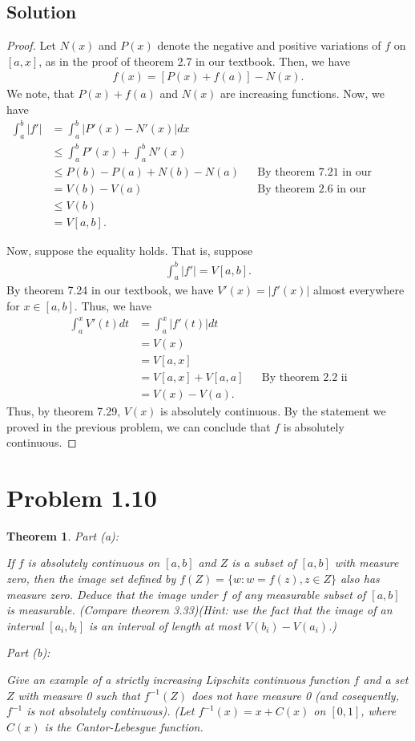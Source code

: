 \documentclass[10pt,a4paper]{article}
\makeatletter
\theoremstyle{theorem}
\newtheorem{theorem}{Theorem}
\newcommand{\proofpart}[2]{%
  \par
  \addvspace{\medskipamount}%
  \noindent\emph{Part #1: #2}\par\nobreak
  \addvspace{\smallskipamount}%
  \@afterheading
}
\theoremstyle{definition}
\makeatother
\begin{document}
\subsection*{Solution}
\begin{proof}
Let $N(x)$ and $P(x)$ denote the negative and positive variations of $f$ on $[a, x]$, as in the proof of theorem 2.7 in our textbook. Then, we have
\begin{align*}
f(x) = [P(x) + f(a)] - N(x).
\end{align*}
We note, that $P(x) + f(a)$ and $N(x)$ are increasing functions. Now, we have
\begin{align*}
\int_a^b |f'| &= \int_a^b |P'(x) - N'(x)| dx\\
&\leq \int_a^b P'(x) + \int_a^b N'(x)\\
&\leq P(b) - P(a) + N(b) - N(a) &&\text{By theorem 7.21 in our textbook}\\
&= V(b) - V(a) &&\text{By theorem 2.6 in our textbook}\\
&\leq V(b)\\
&= V[a, b].
\end{align*}

Now, suppose the equality holds. That is, suppose
\begin{align*}
\int_a^b |f'| = V[a, b].
\end{align*}
By theorem 7.24 in our textbook, we have $V'(x) = |f'(x)|$ almost everywhere for $x \in [a, b]$. Thus, we have
\begin{align*}
\int_a^x V'(t) dt &= \int_a^x |f'(t)| dt\\
&= V(x)\\
&= V[a, x]\\
&= V[a, x] + V[a, a] &&\text{By theorem 2.2 ii}\\
&= V(x) - V(a).
\end{align*}
Thus, by theorem 7.29, $V(x)$ is absolutely continuous. By the statement we proved in the previous problem, we can conclude that $f$ is absolutely continuous.
\end{proof}

\section*{Problem 1.10}
\begin{theorem}
\proofpart{(a)}{} If $f$ is absolutely continuous on $[a, b]$ and $Z$ is a subset of $[a, b]$ with measure zero, then the image set defined by $f(Z) = \{w: w = f(z), z \in Z\}$ also has measure zero. Deduce that the image under $f$ of any measurable subset of $[a, b]$ is measurable. (Compare theorem 3.33)(Hint: use the fact that the image of an interval $[a_i, b_i]$ is an interval of length at most $V(b_i) - V(a_i)$.)
\proofpart{(b)}{} Give an example of a strictly increasing Lipschitz continuous function $f$ and a set $Z$ with measure 0 such that $f^{-1}(Z)$ does not have measure 0 (and cosequently, $f^{-1}$ is not absolutely continuous). (Let $f^{-1}(x) = x + C(x)$ on $[0, 1]$, where $C(x)$ is the Cantor-Lebesgue function. 
\end{theorem}
\end{document}
